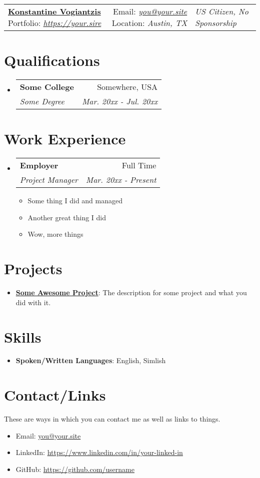 \documentclass[letterpaper, 9pt]{article}
\makeatletter
\newcommand{\resumeItem}[2]{
  \item\small{
    \textbf{#1}{: #2 \vspace{-2pt}}
  }
}
\newcommand{\expItem}[1]{
  \item\small{#1 \vspace{-3pt}}
}
\newcommand{\resumeSubheading}[4]{
 \vspace{-1pt}\item
 \begin{tabular*}{0.97\textwidth}[t]{l@{\extracolsep{\fill}}r}
   \textbf{#1} & #2 \\
   \textit{\small#3} & \textit{\small #4} \\
 \end{tabular*}\vspace{-5pt}
}
\newcommand{\resumeSubItem}[2]{\resumeItem{#1}{#2}\vspace{-4pt}}
\newcommand{\resumeSubHeadingListStart}{\begin{itemize}[leftmargin=*]}
\newcommand{\resumeSubHeadingListEnd}{\end{itemize}}
\newcommand{\resumeItemListStart}{\begin{itemize}}
\newcommand{\resumeItemListEnd}{\end{itemize}\vspace{-5pt}}
\newcommand{\resumeHeading}[5]{
 \begin{tabular*}{\textwidth}{l@{\extracolsep{\fill}}r}
   \textbf{#1}
   \cr Portfolio: \textit{#2}
   & Email: \textit{#3}
   \cr Location: \textit{#4}
   & \textit{#5}
 \end{tabular*}
}
\makeatother
\begin{document}
\resumeHeading{\href{https://your.site}{\Large Konstantine Vogiantzis}}
{\href{https://your.site}{https://your.sire}}
{\href{mailto:you@your.site}{you@your.site}}
{Austin, TX}
{US Citizen, No Sponsorship}

\section{Qualifications}
  \resumeSubHeadingListStart
    \resumeSubheading
      {Some College}{Somewhere, USA}
      {Some Degree}{Mar. 20xx - Jul. 20xx}
\resumeSubHeadingListEnd

\section{Work Experience}
  \resumeSubHeadingListStart
    \resumeSubheading
      {Employer}{Full Time}
      {Project Manager}{Mar. 20xx - Present}
      \resumeItemListStart
      \expItem{Some thing I did and managed}
      \expItem{Another great thing I did}
      \expItem{Wow, more things}
    \resumeItemListEnd
  \resumeSubHeadingListEnd

\section{Projects}
  \resumeSubHeadingListStart
    \resumeSubItem{\href{https://github.com}{Some Awesome Project}}
    {The description for some project and what you did with it.}
  \resumeSubHeadingListEnd

\section{Skills}
  \resumeSubHeadingListStart
    \resumeSubItem{Spoken/Written Languages}
      {English, Simlish}
  \resumeSubHeadingListEnd

\section{Contact/Links}
  These are ways in which you can contact me as well as links to things.
  \resumeItemListStart
    \item{Email: \href{mailto:you@your.site}{you@your.site}}
    \item{LinkedIn: \href{https://www.linkedin.com/in/your-linked-in}{https://www.linkedin.com/in/your-linked-in}}
    \item{GitHub: \href{https://github.com/username}{https://github.com/username}}
  \resumeItemListEnd

\end{document}
